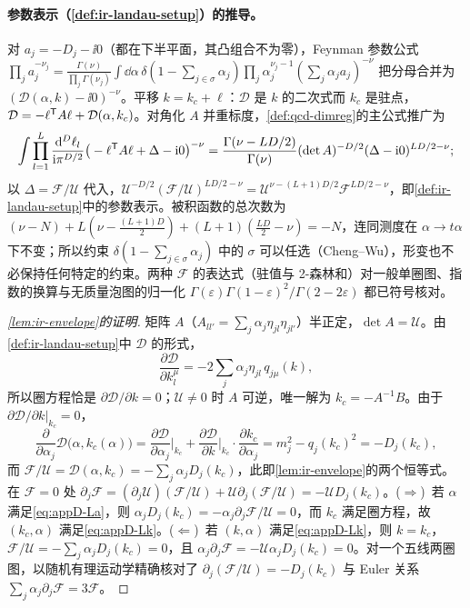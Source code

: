 \paragraph{参数表示（\cref{def:ir-landau-setup}）的推导。}对 $a_j=-D_j-\ii0$（都在下半平面，其凸组合不为零），Feynman 参数公式 $\prod_ja_j^{-\nu_j}=\frac{\Gamma(\nu)}{\prod_j\Gamma(\nu_j)}\int\dd\alpha\,\delta(1-\sum_{j\in\sigma}\alpha_j)\prod_j\alpha_j^{\nu_j-1}(\sum_j\alpha_ja_j)^{-\nu}$ 把分母合并为 $(\mathcal D(\alpha,k)-\ii0)^{-\nu}$。平移 $k=k_c+\ell$：$\mathcal D$ 是 $k$ 的二次式而 $k_c$ 是驻点，$\mathcal D=-\ell^{\mathsf{T}}A\ell+\mathcal D(\alpha,k_c)$。对角化 $A$ 并重标度，\cref{def:qcd-dimreg}的主公式推广为
\[
\int\prod_{l=1}^L\frac{\mathrm{d}^D\ell_l}{\mathrm{i}\pi^{D/2}}\big(-\ell^{\mathsf{T}}A\ell+\Delta-\mathrm{i}0\big)^{-\nu}=\frac{\Gamma(\nu-LD/2)}{\Gamma(\nu)}(\det A)^{-D/2}(\Delta-\mathrm{i}0)^{LD/2-\nu};
\]
以 $\Delta=\mathcal F/\mathcal U$ 代入，$\mathcal U^{-D/2}(\mathcal F/\mathcal U)^{LD/2-\nu}=\mathcal U^{\nu-(L+1)D/2}\mathcal F^{LD/2-\nu}$，即\cref{def:ir-landau-setup}中的参数表示。被积函数的总次数为 $(\nu-N)+L(\nu-\frac{(L+1)D}2)+(L+1)(\frac{LD}2-\nu)=-N$，连同测度在 $\alpha\to t\alpha$ 下不变；所以约束 $\delta(1-\sum_{j\in\sigma}\alpha_j)$ 中的 $\sigma$ 可以任选（Cheng--Wu），形变也不必保持任何特定的约束。两种 $\mathcal F$ 的表达式（驻值与 2-森林和）对一般单圈图、指数的换算与无质量泡图的归一化 $\Gamma(\varepsilon)\Gamma(1-\varepsilon)^2/\Gamma(2-2\varepsilon)$ 都已符号核对。

\begin{proof}[\cref{lem:ir-envelope}的证明]
矩阵 $A$（$A_{ll'}=\sum_j\alpha_j\eta_{jl}\eta_{jl'}$）半正定，$\det A=\mathcal U$。由\cref{def:ir-landau-setup}中 $\mathcal D$ 的形式，
\[
\frac{\partial\mathcal D}{\partial k_l^\mu}=-2\sum_j\alpha_j\eta_{jl}\,q_{j\mu}(k),
\]
所以圈方程恰是 $\partial\mathcal D/\partial k=0$；$\mathcal U\ne0$ 时 $A$ 可逆，唯一解为 $k_c=-A^{-1}B$。由于 $\partial\mathcal D/\partial k|_{k_c}=0$，
\[
\frac{\partial}{\partial\alpha_j}\mathcal D\big(\alpha,k_c(\alpha)\big)=\frac{\partial\mathcal D}{\partial\alpha_j}\Big|_{k_c}+\frac{\partial\mathcal D}{\partial k}\Big|_{k_c}\cdot\frac{\partial k_c}{\partial\alpha_j}=m_j^2-q_j(k_c)^2=-D_j(k_c),
\]
而 $\mathcal F/\mathcal U=\mathcal D(\alpha,k_c)=-\sum_j\alpha_jD_j(k_c)$，此即\cref{lem:ir-envelope}的两个恒等式。在 $\mathcal F=0$ 处 $\partial_j\mathcal F=(\partial_j\mathcal U)(\mathcal F/\mathcal U)+\mathcal U\partial_j(\mathcal F/\mathcal U)=-\mathcal U D_j(k_c)$。($\Rightarrow$)~若 $\alpha$ 满足\cref{eq:appD-La}，则 $\alpha_jD_j(k_c)=-\alpha_j\partial_j\mathcal F/\mathcal U=0$，而 $k_c$ 满足圈方程，故 $(k_c,\alpha)$ 满足\cref{eq:appD-Lk}。($\Leftarrow$)~若 $(k,\alpha)$ 满足\cref{eq:appD-Lk}，则 $k=k_c$，$\mathcal F/\mathcal U=-\sum_j\alpha_jD_j(k_c)=0$，且 $\alpha_j\partial_j\mathcal F=-\mathcal U\alpha_jD_j(k_c)=0$。对一个五线两圈图，以随机有理运动学精确核对了 $\partial_j(\mathcal F/\mathcal U)=-D_j(k_c)$ 与 Euler 关系 $\sum_j\alpha_j\partial_j\mathcal F=3\mathcal F$。
\end{proof}

